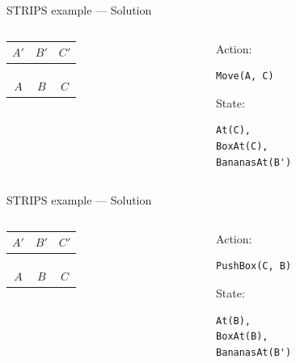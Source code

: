 \begin{frame}[fragile]{STRIPS example --- Solution}
	\begin{columns}
		\begin{column}{0.4\textwidth}
	\begin{center}
			\begin{tabular}{c|c|c}
				  $A'$  &   $B'$  &   $C'$  \\\hline
				\emptyy & \banana & \emptyy \\
				\emptyy & \emptyy & \emptyy \\
				\emptyy & \emptyy & \boxbox\monkey \\\hline
				  $A$   &   $B$   &    $C$
			\end{tabular}
	\end{center}
		\end{column}
		\begin{column}{0.58\textwidth}
			Action:
			\begin{lstlisting}
Move(A, C)
			\end{lstlisting}
			State:
			\begin{lstlisting}
At(C),
BoxAt(C),
BananasAt(B')
			\end{lstlisting}
		\end{column}
	\end{columns}
\end{frame}

\begin{frame}[fragile]{STRIPS example --- Solution}
	\begin{columns}
		\begin{column}{0.4\textwidth}
	\begin{center}
			\begin{tabular}{c|c|c}
				  $A'$  &   $B'$  &   $C'$  \\\hline
				\emptyy & \banana & \emptyy \\
				\emptyy & \emptyy & \emptyy \\
				\emptyy & \boxbox\monkey & \emptyy \\\hline
				  $A$   &   $B$   &    $C$
			\end{tabular}
	\end{center}
		\end{column}
		\begin{column}{0.58\textwidth}
			Action:
			\begin{lstlisting}
PushBox(C, B)
			\end{lstlisting}
			State:
			\begin{lstlisting}
At(B),
BoxAt(B),
BananasAt(B')
			\end{lstlisting}
		\end{column}
	\end{columns}
\end{frame}

